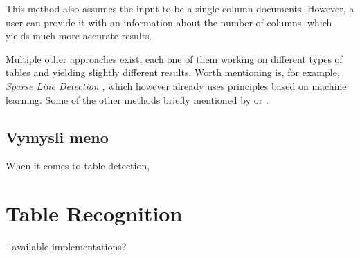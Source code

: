 This method also assumes the input to be a single-column documents. However, a user can provide it with an information about the number of columns, which yields much more accurate results.

Multiple other approaches exist, each one of them working on different types of tables and yielding slightly different results. Worth mentioning is, for example, \emph{Sparse Line Detection} \cite{sparseLineDetection}, which however already uses principles based on machine learning. Some of the other methods briefly mentioned by \citet{otherDetection1} or \citet{otherDetection2}.

\subsection{Vymysli meno}

When it comes to table detection, 


\section{Table Recognition}

- available implementations? 
